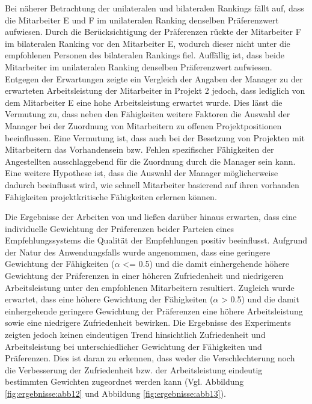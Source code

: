 Bei näherer Betrachtung der unilateralen und bilateralen Rankings fällt auf, dass die Mitarbeiter E und F im unilateralen Ranking denselben Präferenzwert aufwiesen.
Durch die Berücksichtigung der Präferenzen rückte der Mitarbeiter F im bilateralen Ranking vor den Mitarbeiter E, wodurch dieser nicht unter die empfohlenen Personen des bilateralen Rankings fiel.
Auffällig ist, dass beide Mitarbeiter im unilateralen Ranking denselben Präferenzwert aufwiesen.
Entgegen der Erwartungen zeigte ein Vergleich der Angaben der Manager zu der erwarteten Arbeitsleistung der Mitarbeiter in Projekt 2 jedoch, dass lediglich von dem Mitarbeiter E eine hohe Arbeitsleistung erwartet wurde.
Dies lässt die Vermutung zu, dass neben den Fähigkeiten weitere Faktoren die Auswahl der Manager bei der Zuordnung von Mitarbeitern zu offenen Projektpositionen beeinflussen.
Eine Vermutung ist, dass auch bei der Besetzung von Projekten mit Mitarbeitern das Vorhandensein bzw. Fehlen spezifischer Fähigkeiten der Angestellten ausschlaggebend für die Zuordnung durch die Manager sein kann.  
Eine weitere Hypothese ist, dass die Auswahl der Manager möglicherweise dadurch beeinflusst wird, wie schnell Mitarbeiter basierend auf ihren vorhanden Fähigkeiten projektkritische Fähigkeiten erlernen können.

Die Ergebnisse der Arbeiten von \textcite[S. 131ff.]{kleinerman:2:inproceedings} und \textcite[S. 4031 ff.]{neve:inproceedings} ließen darüber hinaus erwarten, dass eine individuelle Gewichtung der Präferenzen beider Parteien eines Empfehlungssystems die Qualität der Empfehlungen positiv beeinflusst.
Aufgrund der Natur des Anwendungsfalls wurde angenommen, dass eine geringere Gewichtung der Fähigkeiten ($\alpha$ <= 0.5) und die damit einhergehende höhere Gewichtung der Präferenzen in einer höheren Zufriedenheit und niedrigeren Arbeitsleistung unter den empfohlenen Mitarbeitern resultiert.
Zugleich wurde erwartet, dass eine höhere Gewichtung der Fähigkeiten ($\alpha$ > 0.5) und die damit einhergehende geringere Gewichtung der Präferenzen eine höhere Arbeitsleistung sowie eine niedrigere Zufriedenheit bewirken.
Die Ergebnisse des Experiments zeigten jedoch keinen eindeutigen Trend hinsichtlich Zufriedenheit und Arbeitsleistung bei unterschiedlicher Gewichtung der Fähigkeiten und Präferenzen.
Dies ist daran zu erkennen, dass weder die Verschlechterung noch die Verbesserung der Zufriedenheit bzw. der Arbeitsleistung eindeutig bestimmten Gewichten zugeordnet werden kann (Vgl. Abbildung \ref{fig:ergebnisse:abb12} und Abbildung \ref{fig:ergebnisse:abb13}).

